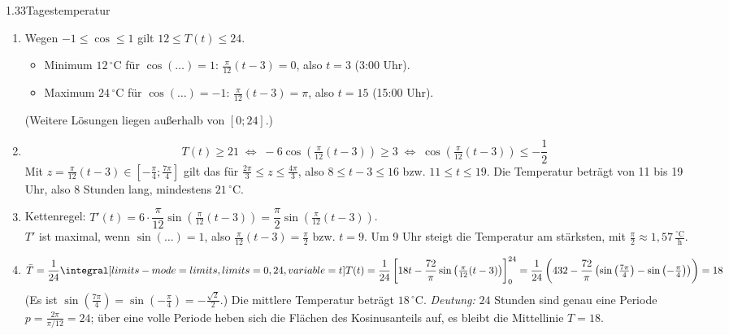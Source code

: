 \begin{loesung}{1.33}{Tagestemperatur}
\begin{enumerate}[label=\alph*)]
  \item Wegen $-1\leq\cos\leq 1$ gilt $12\leq T(t)\leq 24$.
  \begin{itemize}
    \item Minimum $12\,^{\circ}$C für $\cos{(\ldots)}=1$: $\frac{\pi}{12}(t-3) = 0$, also $t=3$ (3:00 Uhr).
    \item Maximum $24\,^{\circ}$C für $\cos{(\ldots)}=-1$: $\frac{\pi}{12}(t-3) = \pi$, also $t=15$ (15:00 Uhr).
  \end{itemize}
  (Weitere Lösungen liegen außerhalb von $[0;24]$.)
  \item \[T(t)\geq 21\;\Longleftrightarrow\;-6\cos{\left(\tfrac{\pi}{12}(t-3)\right)}\geq 3\;\Longleftrightarrow\;\cos{\left(\tfrac{\pi}{12}(t-3)\right)}\leq-\dfrac{1}{2}\]
  Mit $z = \frac{\pi}{12}(t-3)\in\left[-\frac{\pi}{4};\frac{7\pi}{4}\right]$ gilt das für $\frac{2\pi}{3}\leq z\leq\frac{4\pi}{3}$, also $8\leq t-3\leq 16$ bzw. $11\leq t\leq 19$. Die Temperatur beträgt von 11 bis 19 Uhr, also $8$ Stunden lang, mindestens $21\,^{\circ}$C.
  \item Kettenregel: $T'(t) = 6\cdot\dfrac{\pi}{12}\sin{\left(\tfrac{\pi}{12}(t-3)\right)} = \dfrac{\pi}{2}\sin{\left(\tfrac{\pi}{12}(t-3)\right)}$.\\
  $T'$ ist maximal, wenn $\sin{(\ldots)} = 1$, also $\frac{\pi}{12}(t-3) = \frac{\pi}{2}$ bzw. $t=9$. Um 9 Uhr steigt die Temperatur am stärksten, mit $\frac{\pi}{2}\approx 1{,}57\,\frac{^{\circ}\text{C}}{\text{h}}$.
  \item \[\bar{T} = \dfrac{1}{24}\integral[limits-mode=limits,limits={0, 24}, variable={t}]{T(t)} = \dfrac{1}{24}\left[18t-\dfrac{72}{\pi}\sin{\left(\tfrac{\pi}{12}(t-3)\right)}\right]_0^{24} = \dfrac{1}{24}\left(432-\dfrac{72}{\pi}\left(\sin{\left(\tfrac{7\pi}{4}\right)}-\sin{\left(-\tfrac{\pi}{4}\right)}\right)\right) = 18\]
  (Es ist $\sin{(\frac{7\pi}{4})} = \sin{(-\frac{\pi}{4})} = -\frac{\sqrt{2}}{2}$.) Die mittlere Temperatur beträgt $18\,^{\circ}$C. \textit{Deutung:} $24$ Stunden sind genau eine Periode $p = \frac{2\pi}{\pi/12} = 24$; über eine volle Periode heben sich die Flächen des Kosinusanteils auf, es bleibt die Mittellinie $T=18$.
\end{enumerate}
\end{loesung}

